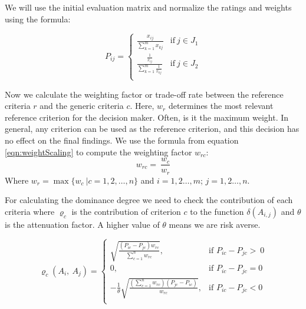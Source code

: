 \documentclass{infor}
\theoremstyle{remark}
\begin{document}
\begin{steps}

\item We will use the initial evaluation matrix and normalize the ratings and weights using the formula:

\begin{equation}
\label{eqn:normalizationFormula}
P_{ij} = \left\{ \begin{matrix}
\frac{x_{ij}}{\sum_{k = 1}^{m}x_{kj}} & \text{if}\ j \in J_{1} \\
\frac{\frac{1}{x_{ij}}}{\sum_{k = 1}^{m}\frac{1}{x_{kj}}} & \text{if}\ j \in J_{2} \\
\end{matrix} \right.
\end{equation}
\item Now we calculate the weighting factor or trade-off rate between the reference criteria \(r\) and the generic criteria \(c\). Here, \(w_{r}\) determines the most relevant reference criterion for the decision maker. Often, is it the maximum weight. In general, any criterion can be used as the reference criterion, and this decision has no effect on the final findings. We use the formula from equation \ref{eqn:weightScaling} to compute the weighting factor \(w_{rc}\):
\begin{equation}
\label{eqn:weightScaling}
w_{rc} = \ \frac{w_{c}}{w_{r}}
\end{equation}
Where \(w_{r} = \max{\{ w_{c}\ |c = 1,2, \ldots, n\}}\) and
\(i=1,2\ldots,m\); \(j = 1, 2\ldots, n\).

\item For calculating the dominance degree we need to check the contribution of each criteria where $\varrho_{c}$ is the contribution of criterion $c$ to the function $\delta\left(A_{i,j}\right)$ and $\theta$ is the attenuation factor. A higher value of $\theta$ means we are risk averse.

\begin{equation}
\label{eqn:dominanceDegrees}
\varrho_{c}\left( A_{i},\ A_{j} \right) = \left\{ \begin{matrix}
\sqrt{\frac{(P_{ic} - P_{jc})w_{rc}}{\sum_{c = 1}^{n}w_{rc}}},& \text{if\ \ }P_{ic} - P_{jc} > \ 0 \\
0,& \text{if\ \ }P_{ic} - P_{jc} = 0 \\
 - \frac{1}{\theta}\sqrt{\frac{\left( \sum_{c = 1}^{n}w_{rc} \right)\left( P_{jc} - P_{ic} \right)}{w_{rc}}},& \text{if\ \ }P_{ic} - P_{jc} < 0 \\
\end{matrix} \right.
\end{equation}


\end{steps}
\end{document}
